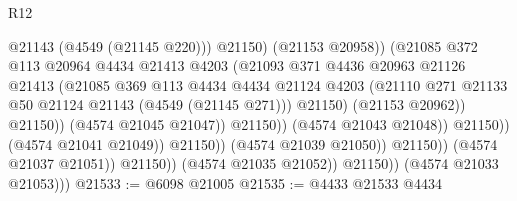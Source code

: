 \begin{lexlean}{R12}
\begin{coremodule}
                                                    @21143
                                                    (@4549 (@21145 @220)))
                                                  @21150)
                                                (@21153 @20958))
                                              (@21085
                                                @372
                                                @113
                                                @20964
                                                @4434
                                                @21413
                                                @4203
                                                (@21093
                                                  @371
                                                  @4436
                                                  @20963
                                                  @21126
                                                  @21413
                                                  (@21085
                                                    @369
                                                    @113
                                                    @4434
                                                    @4434
                                                    @21124
                                                    @4203
                                                    (@21110
                                                      @271
                                                      @21133
                                                      @50
                                                      @21124
                                                      @21143
                                                      (@4549 (@21145 @271)))
                                                    @21150)
                                                  (@21153 @20962))
                                                @21150))
                                            (@4574 @21045 @21047))
                                          @21150))
                                      (@4574 @21043 @21048))
                                    @21150))
                                (@4574 @21041 @21049))
                              @21150))
                          (@4574 @21039 @21050))
                        @21150))
                    (@4574 @21037 @21051))
                  @21150))
              (@4574 @21035 @21052))
            @21150))
        (@4574 @21033 @21053)))
@21533 := @6098 @21005
@21535 := @4433 @21533 @4434

\end{coremodule}
\end{lexlean}
